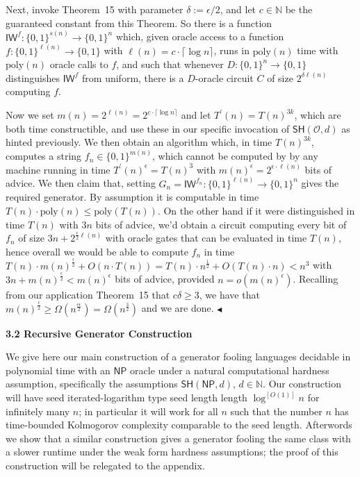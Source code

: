 \documentclass[10pt,a4paper]{article}
\begin{document}
Next, invoke Theorem 15 with parameter $\delta:=\epsilon/2$, and let $c\in\mathbb{N}$ be the guaranteed constant from this Theorem. So there is a function $\mathsf{IW}^{f}:\{0,1\}^{s(n)}\to\{0,1\}^{n}$ which, given oracle access to a function $f:\{0,1\}^{\ell(n)}\to\{0,1\}$ with $\ell(n)=c\cdot\lceil\log n\rceil$, runs in $\mathrm{poly}(n)$ time with $\mathrm{poly}(n)$ oracle calls to $f$, and such that whenever $D:\{0,1\}^{n}\to\{0,1\}$ distinguishes $\mathsf{IW}^{f}$ from uniform, there is a $D$-oracle circuit $C$ of size $2^{\delta\ell(n)}$ computing $f$.\par




Now we set $m(n)=2^{\ell(n)}=2^{c\cdot\lceil\log n\rceil}$ and let $T^{\prime}(n)=T(n)^{3k}$, which are both time constructible, and use these in our specific invocation of $\mathsf{SH}(\mathcal{O},d)$ as hinted previously. We then obtain an algorithm which, in time $T(n)^{3k}$, computes a string $f_{n}\in\{0,1\}^{m(n)}$, which cannot be computed by by any machine running in time $T^{\prime}(n)^{\epsilon}=T(n)^{3}$ with $m(n)^{\epsilon}=2^{\epsilon\cdot\ell(n)}$ bits of advice. We then claim that, setting $G_{n}=\mathsf{IW}^{f_{n}}:\{0,1\}^{\ell(n)}\to\{0,1\}^{n}$ gives the required generator. By assumption it is computable in time $T(n)\cdot\mathrm{poly}(n)\leq\mathrm{poly}(T(n))$. On the other hand if it were distinguished in time $T(n)$ with $3n$ bits of advice, we’d obtain a circuit computing every bit of $f_{n}$ of size $3n+2^{\frac{\epsilon}{2}\ell(n)}$ with oracle gates that can be evaluated in time $T(n)$, hence overall we would be able to compute $f_{n}$ in time $T(n)\cdot m(n)^{\frac{\epsilon}{2}}+O(n\cdot T(n))=T(n)\cdot n^{\frac{1}{2}}+O(T(n)\cdot n)<n^{3}$ with $3n+m(n)^{\frac{\epsilon}{2}}<m(n)^{\epsilon}$ bits of advice, provided $n=o(m(n)^{\epsilon})$. Recalling from our application Theorem 15 that $c\delta\geq 3$, we have that $m(n)^{\frac{\epsilon}{2}}\geq\Omega(n^{\frac{c\epsilon}{2}})=\Omega(n^{\frac{3}{2}})$ and we are done.
$\blacktriangleleft$\par






\par\medskip\noindent\textbf{
3.2 Recursive Generator Construction}\par




We give here our main construction of a generator fooling languages decidable in polynomial time with an ${\mathsf{NP}}$ oracle under a natural computational hardness assumption, specifically the assumptions $\mathsf{SH}({\mathsf{NP}},d)$, $d\in\mathbb{N}$. Our construction will have seed iterated-logarithm type seed length length $\log^{[O(1)]}n$ for infinitely many $n$; in particular it will work for all $n$ such that the number $n$ has time-bounded Kolmogorov complexity comparable to the seed length. Afterwords we show that a similar construction gives a generator fooling the same class with a slower runtime under the weak form hardness assumptions; the proof of this construction will be relegated to the appendix.\par
\end{document}
